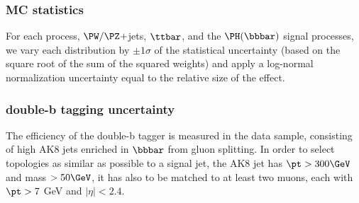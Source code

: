 \subsubsection{MC statistics}
\label{sec:sysmcstat}

For each process, $\PW/\PZ+$jets, $\ttbar$, and the $\PH(\bbbar)$
signal processes, we vary each distribution by $\pm1\sigma$ of the
statistical uncertainty (based on the square root of the sum of the squared weights) and apply a log-normal normalization
uncertainty equal to the relative size of the effect.



\subsubsection{double-b tagging uncertainty}
\label{sec:btag}

The efficiency of the double-b tagger is measured in the data sample, consisting of high \pt AK8 jets enriched in $\bbbar$ from gluon splitting.
In order to select topologies as similar as possible to a signal jet, the AK8 jet has $\pt >300\GeV$ and mass $>50\GeV$, it has also to be matched to at least two muons, each with $\pt > 7$ GeV and $|\eta|< 2.4$. 

